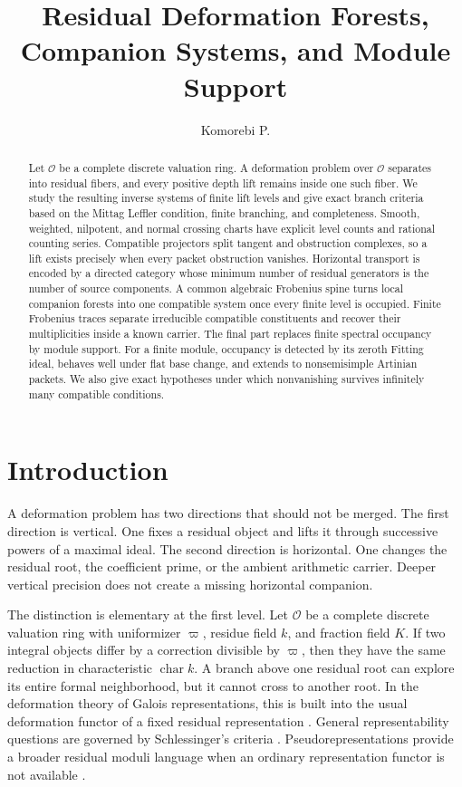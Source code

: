 \documentclass{aomart}
\title[Residual deformation forests]{Residual Deformation Forests, Companion Systems, and Module Support}
\author[Komorebi P.]{Komorebi P.}
\theoremstyle{definition}
\theoremstyle{remark}
\newcommand{\OO}{\mathcal O}
\begin{document}
\begin{abstract}
Let \(\OO\) be a complete discrete valuation ring. A deformation problem over \(\OO\) separates into residual fibers, and every positive depth lift remains inside one such fiber. We study the resulting inverse systems of finite lift levels and give exact branch criteria based on the Mittag Leffler condition, finite branching, and completeness. Smooth, weighted, nilpotent, and normal crossing charts have explicit level counts and rational counting series. Compatible projectors split tangent and obstruction complexes, so a lift exists precisely when every packet obstruction vanishes. Horizontal transport is encoded by a directed category whose minimum number of residual generators is the number of source components. A common algebraic Frobenius spine turns local companion forests into one compatible system once every finite level is occupied. Finite Frobenius traces separate irreducible compatible constituents and recover their multiplicities inside a known carrier. The final part replaces finite spectral occupancy by module support. For a finite module, occupancy is detected by its zeroth Fitting ideal, behaves well under flat base change, and extends to nonsemisimple Artinian packets. We also give exact hypotheses under which nonvanishing survives infinitely many compatible conditions.
\end{abstract}
\maketitle
\thispagestyle{plain}

\section{Introduction}\label{sec:introduction}

A deformation problem has two directions that should not be merged. The first direction is vertical. One fixes a residual object and lifts it through successive powers of a maximal ideal. The second direction is horizontal. One changes the residual root, the coefficient prime, or the ambient arithmetic carrier. Deeper vertical precision does not create a missing horizontal companion.

The distinction is elementary at the first level. Let \(\OO\) be a complete discrete valuation ring with uniformizer \(\varpi\), residue field \(k\), and fraction field \(K\). If two integral objects differ by a correction divisible by \(\varpi\), then they have the same reduction in characteristic \(\operatorname{char}k\). A branch above one residual root can explore its entire formal neighborhood, but it cannot cross to another root. In the deformation theory of Galois representations, this is built into the usual deformation functor of a fixed residual representation \cite{Mazur1989,Ramakrishna1993,Kisin2010}. General representability questions are governed by Schlessinger's criteria \cite{Schlessinger1968}. Pseudorepresentations provide a broader residual moduli language when an ordinary representation functor is not available \cite{Chenevier2014,BellaicheChenevier2009}.
\end{document}

